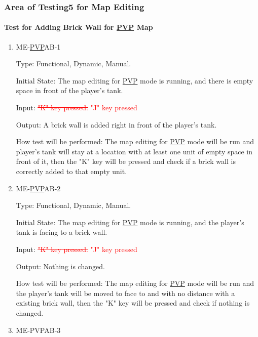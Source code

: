 \documentclass[12pt, titlepage]{article}
\begin{document}
\subsubsection{Area of Testing5 for Map Editing}

\paragraph{Test for Adding Brick Wall for \underline{PVP} Map}

\begin{enumerate}

\item{ME-\underline{PVP}AB-1\\}

Type: Functional, Dynamic, Manual.
					
Initial State: The map editing for \underline{PVP} mode is running, and there is empty space in front of the player's tank.
					
Input: \textcolor{red}{\sout{"K" key pressed.}} \textcolor{red}{"J" key pressed}
					
Output: A brick wall is added right in front of the player's tank.
					
How test will be performed: The map editing for \underline{PVP} mode will be run and player's tank will stay at a location with at least one unit of empty space in front of it, then the "K" key will be pressed and check if a brick wall is correctly added to that empty unit.
					
\item{ME-\underline{PVP}AB-2\\}

Type: Functional, Dynamic, Manual.
					
Initial State: The map editing for \underline{PVP} mode is running, and the player's tank is facing to a brick wall.
					
Input: \textcolor{red}{\sout{"K" key pressed.}} \textcolor{red}{"J" key pressed}
					
Output: Nothing is changed.
					
How test will be performed: The map editing for \underline{PVP} mode will be run and the player's tank will be moved to face to and with no distance with a existing brick wall, then the "K" key will be pressed and check if nothing is changed.

\item{ME-PVPAB-3\\}


\end{enumerate}
\end{document}
